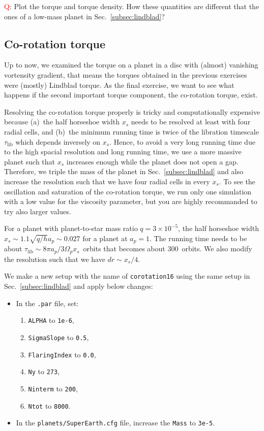 \documentclass[14pt]{scrartcl}
\begin{document}
\textcolor{red}{Q}: Plot the torque and torque density. How these quantities are different that the ones of a low-mass planet in Sec.~\ref{subsec:lindblad}?

\subsection{Co-rotation torque} \label{subsec:corotation}	
Up to now, we examined the torque on a planet in a disc with (almost) vanishing vortensity gradient, that means the torques obtained in the previous exercises were (mostly) Lindblad torque. As the final exercise, we want to see what happens if the second important torque component, the co-rotation torque, exist. 

Resolving the co-rotation torque properly is tricky and computationally expensive because (a)~the half horseshoe width $x_s$ needs to be resolved at least with four radial cells, and (b)~the minimum running time is twice of the libration timescale $\tau_{\mathrm{lib}}$ which depends inversely on $x_s$. Hence, to avoid a very long running time due to the high spacial resolution and long running time, we use a more massive planet such that $x_s$ increases enough while the planet does not open a gap. Therefore, we triple the mass of the planet in Sec.~\ref{subsec:lindblad} and also increase the resolution such that we have four radial cells in every $x_s$. To see the oscillation and saturation of the co-rotation torque, we run only one simulation with a low value for the viscosity parameter, but you are highly recommanded to try also larger values.

For a planet with planet-to-star mass ratio $q=3 \times 10^{-5}$, the half horseshoe width $x_s \sim 1.1 \sqrt{q/h} a_p \sim 0.027$ for a planet at $a_p=1$. The running time needs to be about $\tau_{\mathrm{lib}} \sim 8 \pi a_p/3 \Omega_p x_s  $~orbits that becomes about 300~orbits. We also modify the resolution such that we have $dr \sim x_s/4$.

We make a new setup with the name of \texttt{corotation16} using the same setup in Sec.~\ref{subsec:lindblad} and apply below changes:  
\begin{itemize}
	\item In the \texttt{.par} file, set:
	\begin{enumerate}
		\item \texttt{ALPHA} to \texttt{1e-6},
		\item \texttt{SigmaSlope} to \texttt{0.5},
		\item \texttt{FlaringIndex} to \texttt{0.0},
		\item \texttt{Ny} to \texttt{273},
		\item \texttt{Ninterm} to \texttt{200},
		\item \texttt{Ntot} to \texttt{8000}. 	
	\end{enumerate}
	\item In the \texttt{planets/SuperEarth.cfg} file, increase the \texttt{Mass} to \texttt{3e-5}.
\end{itemize}
\end{document}

